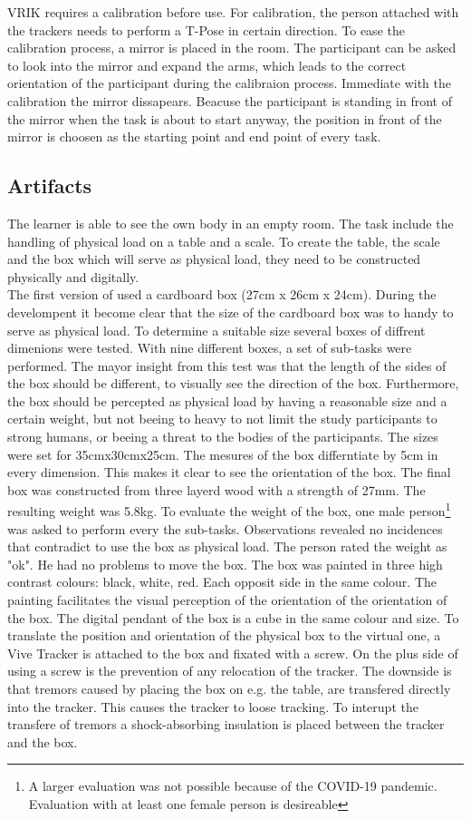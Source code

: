 VRIK requires a calibration before use. For calibration, the person attached with the trackers needs to perform a T-Pose in certain direction. To ease the calibration process, a mirror is placed in the room. The participant can be asked to look into the mirror and expand the arms, which leads to the correct orientation of the participant during the calibraion process. Immediate with the calibration the mirror dissapears. Beacuse the participant is standing in front of the mirror when the task is about to start anyway, the position in front of the mirror is choosen as the starting point and end point of every task.


\subsection{Artifacts}
The learner is able to see the own body in an empty room. The task include the handling of physical load on a table and a scale. To create the table, the scale and the box which will serve as physical load, they need to be constructed physically and digitally.\\
The first version of \exgo used a cardboard box (27cm x 26cm x 24cm). During the develompent it become clear that the size of the cardboard box was to handy to serve as physical load. To determine a suitable size several boxes of diffrent dimenions were tested. With nine different boxes, a set of sub-tasks were performed. The mayor insight from this test was that the length of the sides of the box should be different, to visually see the direction of the box. Furthermore, the box should be percepted as physical load by having a reasonable size and a certain weight, but not beeing to heavy to not limit the study participants to strong humans, or beeing a threat to the bodies of the participants. The sizes were set for 35cmx30cmx25cm. The mesures  of the box differntiate by 5cm in every dimension. This makes it clear to see the orientation of the box. The final box was constructed from three layerd wood with a strength of 27mm. The resulting weight was 5.8kg. To evaluate the weight of the box, one male person\footnote{A larger evaluation was not possible because of the COVID-19 pandemic. Evaluation with at least one female person is desireable} was asked to perform every the sub-tasks. Observations revealed no incidences that contradict to use the box as physical load. The person rated the weight as "ok". He had no problems to move the box. The box was painted in three high contrast colours: black, white, red. Each opposit side in the same colour. The painting facilitates the visual perception of the orientation of the orientation of the box. The digital pendant of the box is a cube in the same colour and size. To translate the position and orientation of the physical box to the virtual one, a Vive Tracker is attached to the box and fixated with a screw. On the plus side of using a screw is the prevention of any relocation of the tracker. The downside is that tremors caused by placing the box on e.g. the table, are transfered directly into the tracker. This causes the tracker to loose tracking. To interupt the transfere of tremors a shock-absorbing insulation is placed between the tracker and the box.\\
